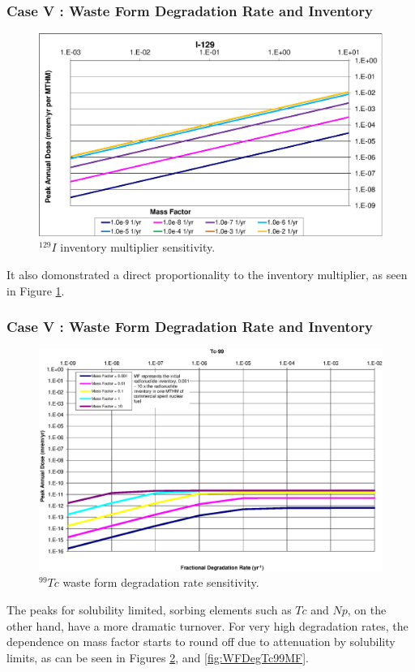 \begin{frame}[c]
  \frametitle{Case V : Waste Form Degradation Rate and Inventory}
\begin{figure}[ht!]
  \centering
  \includegraphics[width=\linewidth]{129IMF.eps}
  \caption{$^{129}I$ inventory multiplier sensitivity.}
  \label{fig:WFDegI129MF}
\end{figure}

It also domonstrated a direct proportionality to the inventory 
multiplier, as seen in Figure \ref{fig:WFDegI129MF}. 
\end{frame}



\begin{frame}[c]
  \frametitle{Case V : Waste Form Degradation Rate and Inventory}
\begin{figure}[ht!]
  \centering
  \includegraphics[width=\linewidth]{99TcDegRate.eps}
  \caption{$^{99}Tc$ waste form degradation rate sensitivity.}
  \label{fig:WFDegTc99}
\end{figure}
The peaks for solubility limited, sorbing elements such as $Tc$ and $Np$, on the 
other hand, have a more dramatic turnover.  For very high degradation rates, the 
dependence on mass factor starts to round off due to attenuation by solubility 
limits, as can be seen in Figures 
\ref{fig:WFDegTc99}, and \ref{fig:WFDegTc99MF}.
\end{frame}

